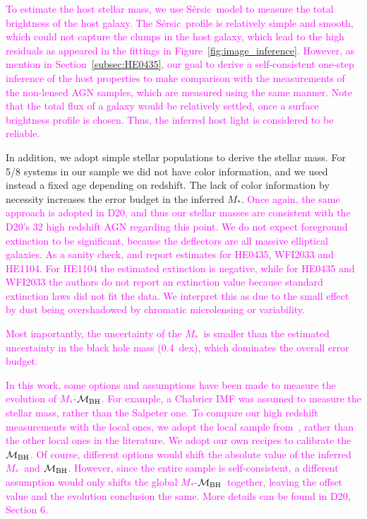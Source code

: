 \documentclass[fleqn,usenatbib]{mnras}
\newcommand{\mbh}{$\mathcal M_{\rm BH}$}
\newcommand{\sersic}{S\'ersic}
\newcommand{\mstar}{{$M_*$}}
\newcommand{\pink}[1]{{\textcolor{magenta}{#1}}}
\begin{document}
\pink{To estimate the host stellar mass, we use \sersic\ model to measure the total brightness of the host galaxy. The \sersic\ profile is relatively simple and smooth, which could not capture the clumps in the host galaxy, which lead to the high residuals as appeared in the fittings in Figure~\ref{fig:image_inference}. However, as mention in Section~\ref{subsec:HE0435}, our goal to derive a self-consistent one-step inference of the host properties to make comparison with the measurements of the non-lensed AGN samples, which are measured using the same manner. Note that the total flux of a galaxy would be relatively settled, once a surface brightness profile is chosen. Thus, the inferred host light is considered to be reliable.
}

In addition, we adopt simple stellar populations to derive the stellar mass. For 5/8 systems in our sample we did not have color information, and we used instead a fixed age depending on redshift. The lack of color information by necessity increases the error budget in the inferred \mstar. \pink{Once again, the same approach is adopted in D20, and thus our stellar masses are consistent with the D20's 32 high redshift AGN regarding this point.}
\pink{We do not expect foreground extinction to be significant, because the deflectors are all massive elliptical galaxies. As a sanity check, \citet{1999ApJ...523..617F} and \citet{2008A&A...485..403O} report estimates for HE0435, WFI2033 and HE1104. For HE1104 the estimated extinction is negative, while for HE0435 and WFI2033 the authors do not report an extinction value because standard extinction laws did not fit the data. We interpret this as due to the small effect by dust being overshadowed by chromatic microlensing or variability.}

\pink{Most importantly, the uncertainty of the \mstar\ is smaller than the estimated uncertainty in the black hole mass (0.4~dex), which dominates the overall error budget.}

\pink{In this work, some options and assumptions have been made to measure the evolution of \mstar-\mbh. For example, a Chabrier IMF was assumed to measure the stellar mass, rather than the Salpeter one. To compare our high redshift measurements with the local ones, we adopt the local sample from~\citet{Bennert++2011, H+R04}, rather than the other local ones in the literature. We adopt our own recipes to calibrate the \mbh. Of course, different options would shift the absolute value of the inferred \mstar\ and \mbh. However, since the entire sample is self-consistent, a different assumption would only shifts the global \mstar-\mbh\ together, leaving the offset value and the evolution conclusion the same. More details can be found in D20, Section 6.}
\end{document}
